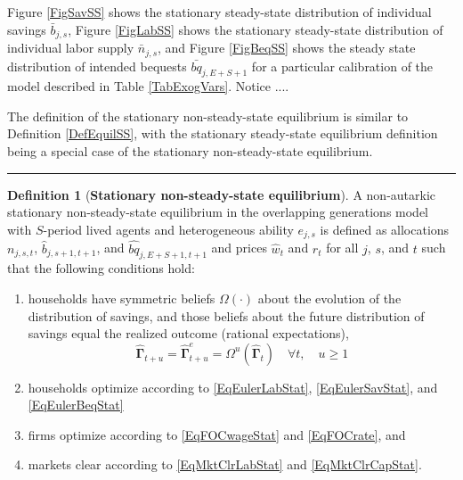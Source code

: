 \documentclass[letterpaper,12pt]{article}
\theoremstyle{definition}
\newtheorem{definition}{Definition} %
\begin{document}
\begin{spacing}{1.5}
    Figure \ref{FigSavSS} shows the stationary steady-state distribution of individual savings $\bar{b}_{j,s}$, Figure \ref{FigLabSS} shows the stationary steady-state distribution of individual labor supply $\bar{n}_{j,s}$, and Figure \ref{FigBeqSS} shows the steady state distribution of intended bequests $\bar{bq}_{j,E+S+1}$ for a particular calibration of the model described in Table \ref{TabExogVars}. Notice .... %

    The definition of the stationary non-steady-state equilibrium is similar to Definition \ref{DefEquilSS}, with the stationary steady-state equilibrium definition being a special case of the stationary non-steady-state equilibrium.

    \vspace{7mm}
    \end{spacing}
    \hrule
    \begin{definition}[\textbf{Stationary non-steady-state equilibrium}]\label{DefEquilNonSS}
      A non-autarkic stationary non-steady-state equilibrium in the overlapping generations model with $S$-period lived agents and heterogeneous ability $e_{j,s}$ is defined as allocations $n_{j,s,t}$, $\hat{b}_{j,s+1,t+1}$, and $\hat{bq}_{j,E+S+1,t+1}$ and prices $\hat{w}_t$ and $r_t$ for all $j$, $s$, and $t$ such that the following conditions hold:
       \begin{enumerate}
          \item households have symmetric beliefs $\Omega(\cdot)$ about the evolution of the distribution of savings, and those beliefs about the future distribution of savings equal the realized outcome (rational expectations),
            \begin{equation*}
              \bm{\hat{\Gamma}}_{t+u} = \bm{\hat{\Gamma}}^e_{t+u} = \Omega^u\left( \bm{\hat{\Gamma}}_t\right) \quad\forall t, \quad u\geq 1
            \end{equation*}
          \item households optimize according to \eqref{EqEulerLabStat}, \eqref{EqEulerSavStat}, and \eqref{EqEulerBeqStat}
          \item firms optimize according to \eqref{EqFOCwageStat} and \eqref{EqFOCrate}, and
          \item markets clear according to \eqref{EqMktClrLabStat} and \eqref{EqMktClrCapStat}.
       \end{enumerate}
    \end{definition}
\end{document}

